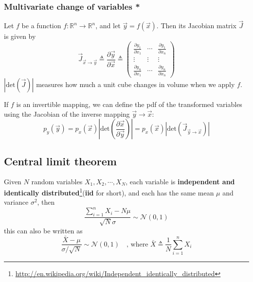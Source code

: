 \subsubsection{Multivariate change of variables *}
Let $f$ be a function $f:\mathbb{R}^n \rightarrow \mathbb{R}^n$, and let $\vec{y}=f(\vec{x})$. Then its Jacobian matrix $\vec{J}$ is given by
\begin{equation}
\vec{J}_{\vec{x} \rightarrow \vec{y}} \triangleq \frac{\partial \vec{y}}{\partial \vec{x}} \triangleq \left(\begin{array}{ccc}
\frac{\partial y_1}{\partial x_1} & \cdots & \frac{\partial y_1}{\partial x_n} \\
\vdots & \vdots & \vdots \\
\frac{\partial y_n}{\partial x_1} & \cdots & \frac{\partial y_n}{\partial x_n}
\end{array}\right)
\end{equation}
$|\mathrm{det}(\vec{J})|$ measures how much a unit cube changes in volume when we apply $f$.

If $f$ is an invertible mapping, we can define the pdf of the transformed variables using the Jacobian of the inverse mapping $\vec{y} \rightarrow \vec{x}$:
\begin{equation}\label{eqn:Multivariate-transformation}
p_y(\vec{y})=p_x(\vec{x})|\mathrm{det}(\frac{\partial \vec{x}}{\partial \vec{y}})|=p_x(\vec{x})|\mathrm{det}(\vec{J}_{\vec{y} \rightarrow \vec{x}})|
\end{equation}


\subsection{Central limit theorem}
Given $N$ random variables $X_1,X_2,\cdots,X_N$, each variable is \textbf{independent and identically distributed}\footnote{\url{http://en.wikipedia.org/wiki/Independent_identically_distributed}}(\textbf{iid} for short), and each has the same mean $\mu$ and variance $\sigma^2$, then
\begin{equation}
\dfrac{\sum\limits_{i=1}^n X_i-N\mu}{\sqrt{N}\sigma} \sim \mathcal{N}(0,1)
\end{equation}
this can also be written as
\begin{equation}
\dfrac{\bar{X}-\mu}{\sigma/\sqrt{N}} \sim \mathcal{N}(0,1) \quad \text{, where } \bar{X} \triangleq \dfrac{1}{N}\sum\limits_{i=1}^n X_i
\end{equation}


